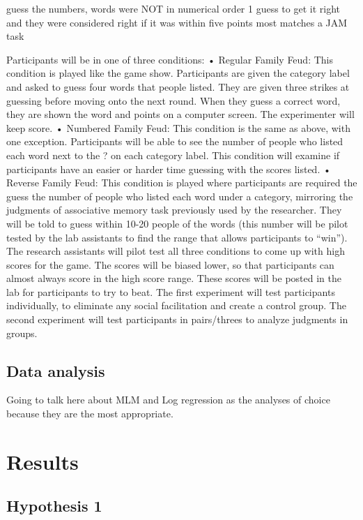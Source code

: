 \documentclass[man]{apa6}
\theoremstyle{definition}
\theoremstyle{definition}
\theoremstyle{definition}
\theoremstyle{remark}
\begin{document}
guess the numbers, words were NOT in numerical order 1 guess to get it
right and they were considered right if it was within five points most
matches a JAM task

Participants will be in one of three conditions: • Regular Family Feud:
This condition is played like the game show. Participants are given the
category label and asked to guess four words that people listed. They
are given three strikes at guessing before moving onto the next round.
When they guess a correct word, they are shown the word and points on a
computer screen. The experimenter will keep score. • Numbered Family
Feud: This condition is the same as above, with one exception.
Participants will be able to see the number of people who listed each
word next to the ? on each category label. This condition will examine
if participants have an easier or harder time guessing with the scores
listed. • Reverse Family Feud: This condition is played where
participants are required the guess the number of people who listed each
word under a category, mirroring the judgments of associative memory
task previously used by the researcher. They will be told to guess
within 10-20 people of the words (this number will be pilot tested by
the lab assistants to find the range that allows participants to
\enquote{win}).\\
The research assistants will pilot test all three conditions to come up
with high scores for the game. The scores will be biased lower, so that
participants can almost always score in the high score range. These
scores will be posted in the lab for participants to try to beat. The
first experiment will test participants individually, to eliminate any
social facilitation and create a control group. The second experiment
will test participants in pairs/threes to analyze judgments in groups.

\hypertarget{data-analysis}{%
\subsection{Data analysis}\label{data-analysis}}

Going to talk here about MLM and Log regression as the analyses of
choice because they are the most appropriate.

\hypertarget{results}{%
\section{Results}\label{results}}

\hypertarget{hypothesis-1}{%
\subsection{Hypothesis 1}\label{hypothesis-1}}
\end{document}
